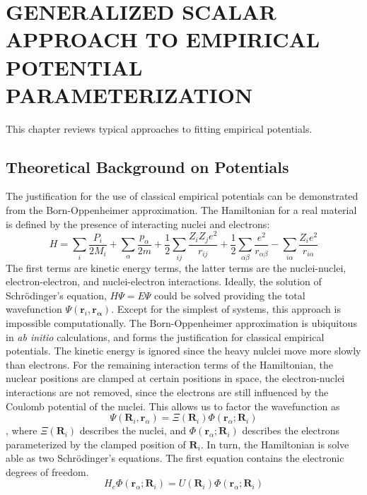 \chapter{GENERALIZED SCALAR APPROACH TO EMPIRICAL POTENTIAL PARAMETERIZATION}

This chapter reviews typical approaches to fitting empirical potentials.
\section{Theoretical Background on Potentials}

The justification for the use of classical empirical potentials can be demonstrated from the Born-Oppenheimer approximation\cite{born1927_bo}.  The Hamiltonian for a real material is defined by the presence of interacting nuclei and electrons:
\begin{equation}
	H = \sum_i \frac{P_i}{2M_i}
	    + \sum_\alpha \frac{p_\alpha}{2m}
	    + \frac{1}{2} \sum_{ij} \frac{Z_i Z_j e^2}{r_{ij}}
	    + \frac{1}{2} \sum_{\alpha\beta} \frac{e^2}{r_{\alpha\beta}}
	    - \sum_{i\alpha} \frac{Z_i e^2}{r_{i\alpha}}
\end{equation}
The first terms are kinetic energy terms, the latter terms are the nuclei-nuclei, electron-electron, and nuclei-electron interactions.  Ideally, the solution of Schr\"{o}dinger's equation, $H\Psi=E\Psi$ could be solved providing the total wavefunction $\Psi(\bm{r}_i,\bm{r_\alpha})$.  Except for the simplest of systems, this approach is impossible computationally.
The Born-Oppenheimer approximation \cite{born1927_bo} is ubiquitous in \emph{ab initio} calculations, and forms the justification for classical empirical potentials.  The kinetic energy is ignored since the heavy nulclei move more slowly than electrons.  For the remaining interaction terms of the Hamiltonian, the nuclear positions are clamped at certain positions in space, the electron-nuclei interactions are not removed, since the electrons are still influenced by the Coulomb potential of the nuclei.  This allows us to factor the wavefunction as
\begin{equation}
	\Psi(\bm{R}_i,\bm{r}_\alpha) = \Xi(\bm{R}_i)\Phi(\bm{r}_\alpha;\bm{R}_i)
\end{equation},
where $\Xi(\bm{R}_i)$ describes the nuclei, and $\Phi(\bm{r}_\alpha;\bm{R}_i)$ describes the electrons parameterized by the clamped position of $\bm{R}_i$.  In turn, the Hamiltonian is solve able as two Schr\"{o}dinger's equations.  The first equation contains the electronic degrees of freedom.
\begin{equation}
\label{eq:BO_electronic}
     H_{e}\Phi(\bm{r}_\alpha;\bm{R}_i)=U(\bm{R}_i)\Phi(\bm{r}_\alpha;\bm{R}_i)
\end{equation}
